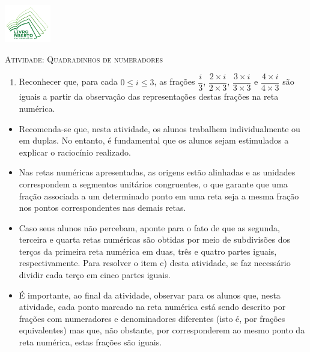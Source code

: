 \documentclass[10 pt,usenames,dvipsnames, oneside]{article}
\begin{document}
\begin{center}
  \begin{minipage}[l]{3cm}
\includegraphics[width=2cm]{../../../Figuras/logo}       
\end{minipage}\hfill
\begin{minipage}[r]{.8\textwidth}
 {\Large \scshape Atividade: Quadradinhos de numeradores}  
\end{minipage}
\end{center}
\vspace{.2cm}

\ifdefined\prof
\begin{goals}
\begin{enumerate}
\item       Reconhecer que, para cada       $0 \leq i \leq 3$, as frações
$\dfrac{i}{3}$,       $\dfrac{2 \times i}{2 \times 3 }$,       $\dfrac{3 \times
i}{3 \times 3}$       e       $\dfrac{4 \times i}{4 \times 3}$       são iguais a
partir da observação das representações destas frações na reta numérica.\end{enumerate}

\tcblower

\begin{itemize}
\item       Recomenda-se que, nesta atividade, os alunos trabalhem
individualmente ou em duplas. No entanto, é fundamental que os alunos sejam
estimulados a explicar o raciocínio realizado.
\item       Nas retas numéricas apresentadas, as origens estão alinhadas e
as unidades correspondem a segmentos unitários congruentes, o que garante que
uma fração associada a um determinado ponto em uma reta seja a mesma fração nos
pontos correspondentes nas demais retas.
\item       Caso seus alunos não percebam, aponte para o fato de que as
segunda, terceira e quarta retas numéricas são obtidas por meio de subdivisões
dos terços da primeira reta numérica em duas, três e quatro partes iguais,
respectivamente. Para resolver o item c) desta atividade, se faz necessário
dividir cada terço em cinco partes iguais.
\item       É importante, ao final da atividade, observar para os alunos
que, nesta atividade, cada ponto marcado na reta numérica está sendo descrito
por frações com numeradores e denominadores diferentes (isto é, por frações
equivalentes) mas que, não obstante, por corresponderem ao mesmo ponto da reta
numérica, estas frações são iguais.
\end{itemize}
\end{goals}
\end{document}
